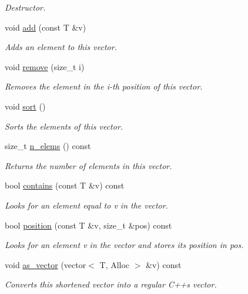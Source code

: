 \begin{DoxyCompactItemize}
\begin{DoxyCompactList}\small\item\em Destructor. \end{DoxyCompactList}\item 
void \hyperlink{classlgraph_1_1utils_1_1svector_a14ffd05a33eeae26ddb0909d8f64ad28}{add} (const T \&v)
\begin{DoxyCompactList}\small\item\em Adds an element to this vector. \end{DoxyCompactList}\item 
void \hyperlink{classlgraph_1_1utils_1_1svector_a9d377cbaa26f09a862334363e2d889cc}{remove} (size\+\_\+t i)
\begin{DoxyCompactList}\small\item\em Removes the element in the i-\/th position of this vector. \end{DoxyCompactList}\item 
void \hyperlink{classlgraph_1_1utils_1_1svector_ac2199e164429f7469decfa9d8f033069}{sort} ()
\begin{DoxyCompactList}\small\item\em Sorts the elements of this vector. \end{DoxyCompactList}\item 
size\+\_\+t \hyperlink{classlgraph_1_1utils_1_1svector_a36428d7450874d526ced6f1e8e0fe353}{n\+\_\+elems} () const 
\begin{DoxyCompactList}\small\item\em Returns the number of elements in this vector. \end{DoxyCompactList}\item 
bool \hyperlink{classlgraph_1_1utils_1_1svector_ab17c14abafd02d01a0e1f8230ed23680}{contains} (const T \&v) const 
\begin{DoxyCompactList}\small\item\em Looks for an element equal to {\itshape v} in the vector. \end{DoxyCompactList}\item 
bool \hyperlink{classlgraph_1_1utils_1_1svector_aed55a2e91d3ba407b5268ba339dddd81}{position} (const T \&v, size\+\_\+t \&pos) const 
\begin{DoxyCompactList}\small\item\em Looks for an element {\itshape v} in the vector and stores its position in {\itshape pos}. \end{DoxyCompactList}\item 
void \hyperlink{classlgraph_1_1utils_1_1svector_a4c616184715432025981cd1f0c67566e}{as\+\_\+vector} (vector$<$ T, Alloc $>$ \&v) const 
\begin{DoxyCompactList}\small\item\em Converts this shortened vector into a regular C++\textquotesingle{}s vector. \end{DoxyCompactList}\end{DoxyCompactItemize}
